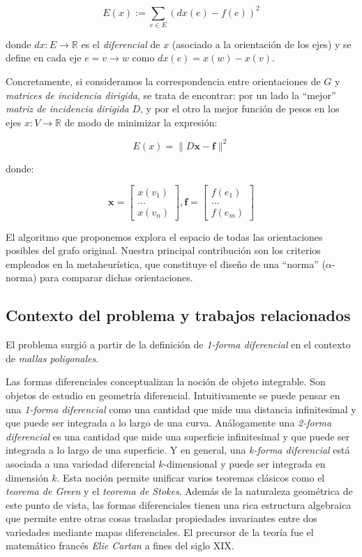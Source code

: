 \documentclass[conference,compsoc,a4paper]{IEEEtran}
\begin{document}
$$E(x) := \sum_{e \in E} (dx(e) - f(e))^2$$

\noindent donde $dx: E \rightarrow \mathbb{R}$ es el \textit{diferencial} de $x$ 
(asociado a la orientación de los ejes) y se define en cada eje 
$e=v\to w$ como $dx(e) = x(w) - x(v)$.

\smallskip

Concretamente, si consideramos la correspondencia entre orientaciones 
de $G$ y \textit{matrices de incidencia dirigida}, se trata de 
encontrar: por un lado la ``mejor'' \textit{matriz de incidencia 
dirigida} $D$, y por el otro la mejor función de pesos en los ejes 
$x: V \rightarrow \mathbb{R}$ de modo de minimizar la expresión:

$$E(x) = \|D\bm{x}-\bm{f}\|^2$$

\noindent donde:

$$
\bm{x} = 
\begin{bmatrix}
	x(v_1)\\
	\dots \\
	x(v_n)
\end{bmatrix}, 
\bm{f} = 
\begin{bmatrix}
	f(e_1)\\
	\dots \\
	f(e_m)
\end{bmatrix}
$$

El algoritmo que proponemos explora el espacio de todas las 
orientaciones posibles del grafo original.
Nuestra principal contribución son los criterios empleados en la
metaheurística, que constituye el diseño de una ``norma'' ($\alpha$-norma)
para comparar dichas orientaciones.

\subsection{Contexto del problema y trabajos relacionados}
El problema surgió a partir de la definición de \textit{1-forma 
diferencial} en el contexto de \textit{mallas poligonales}. 

\bigskip

Las formas diferenciales \cite{S:1965,T:2008} conceptualizan la noción 
de objeto integrable. Son objetos de estudio en geometría diferencial. 
Intuitivamente se puede pensar en una 
\textit{1-forma diferencial} como una cantidad que mide 
una distancia infinitesimal y que puede ser integrada a lo largo de una 
curva. Análogamente una \textit{2-forma diferencial} es una cantidad 
que mide una superficie infinitesimal y que puede ser integrada a lo 
largo de una superficie. Y en general, una \textit{k-forma diferencial} 
está asociada a una variedad diferencial $k$-dimensional y puede ser 
integrada en dimensión $k$. Esta noción permite unificar varios 
teoremas clásicos como el \textit{teorema de Green} y el \textit{teorema 
de Stokes}. Además de la naturaleza geométrica de este punto de vista, 
las formas diferenciales tienen una rica estructura algebraica que 
permite entre otras cosas trasladar propiedades invariantes entre dos 
variedades mediante mapas diferenciales. El precursor de la 
teoría fue el matemático francés \textit{Elie Cartan} a fines del siglo 
XIX.
\end{document}
